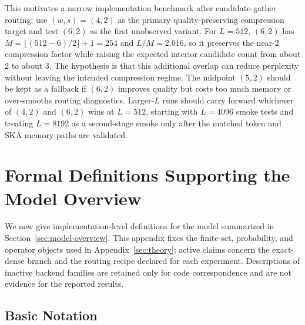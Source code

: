 \documentclass{article}
\theoremstyle{plain}
\theoremstyle{definition}
\theoremstyle{remark}
\begin{document}
This motivates a narrow implementation benchmark after candidate-gather routing:
use $(w,s)=(4,2)$ as the primary quality-preserving compression target and test
$(6,2)$ as the first unobserved variant.  For $L=512$, $(6,2)$ has
$M=\lfloor(512-6)/2\rfloor+1=254$ and $L/M=2.016$, so it preserves the near-2
compression factor while raising the expected interior candidate count from
about 2 to about 3.  The hypothesis is that this additional overlap can reduce
perplexity without leaving the intended compression regime.  The midpoint
$(5,2)$ should be kept as a fallback if $(6,2)$ improves quality but costs too
much memory or over-smooths routing diagnostics.  Larger-$L$ runs should carry
forward whichever of $(4,2)$ and $(6,2)$ wins at $L=512$, starting with
$L=4096$ smoke tests and treating $L=8192$ as a second-stage smoke only after
the matched token and SKA memory paths are validated.

\FloatBarrier



\newpage
\appendix
\onecolumn
\section{Formal Definitions Supporting the Model Overview}
\label{sec:model-objects}

We now give implementation-level definitions for the model summarized in
Section~\ref{sec:model-overview}.  This appendix fixes the finite-set,
probability, and operator objects used in Appendix~\ref{sec:theory}; active
claims concern the exact-dense branch and the routing recipe declared for each
experiment.  Descriptions of inactive backend families are retained only for
code correspondence and are not evidence for the reported results.

\subsection{Basic Notation}
\label{sec:basic-notation}
\end{document}
